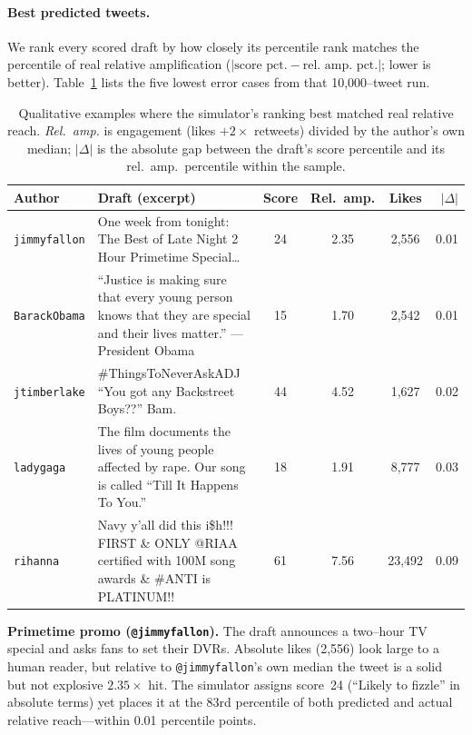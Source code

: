\documentclass[11pt]{article}
\begin{document}
\paragraph{Best predicted tweets.}
We rank every scored draft by how closely its percentile rank matches the
percentile of real relative amplification
($|\text{score pct.} - \text{rel.\ amp.\ pct.}|$; lower is better). Table~\ref{tab:qual-examples} lists the five lowest
error cases from that 10{,}000--tweet run.

\begin{table}[t]
\centering
\small
\caption{Qualitative examples where the simulator's ranking best matched real
relative reach. \emph{Rel.\ amp.} is engagement (likes $+ 2\times$ retweets)
divided by the author's own median; \emph{$|\Delta|$} is the absolute gap between
the draft's score percentile and its rel.\ amp.\ percentile within the sample.}
\label{tab:qual-examples}
\begin{tabular}{@{}p{}p{}cccr@{}}
\toprule
Author & Draft (excerpt) & Score & Rel.\ amp. & Likes & $|\Delta|$ \\
\midrule
\texttt{jimmyfallon} &
One week from tonight: The Best of Late Night 2 Hour Primetime Special\ldots &
24 & 2.35 & 2{,}556 & 0.01 \\
\texttt{BarackObama} &
``Justice is making sure that every young person knows that they are special
and their lives matter.'' ---President Obama &
15 & 1.70 & 2{,}542 & 0.01 \\
\texttt{jtimberlake} &
\#ThingsToNeverAskADJ ``You got any Backstreet Boys??'' Bam. &
44 & 4.52 & 1{,}627 & 0.02 \\
\texttt{ladygaga} &
The film documents the lives of young people affected by rape. Our song is
called ``Till It Happens To You.'' &
18 & 1.91 & 8{,}777 & 0.03 \\
\texttt{rihanna} &
Navy y'all did this i\$h!!! FIRST \& ONLY @RIAA certified with 100M song awards
\& \#ANTI is PLATINUM!! &
61 & 7.56 & 23{,}492 & 0.09 \\
\bottomrule
\end{tabular}
\end{table}

\noindent
\textbf{Primetime promo (\texttt{@jimmyfallon}).}
The draft announces a two--hour TV special and asks fans to set their DVRs.
Absolute likes (2{,}556) look large to a human reader, but relative to
\texttt{@jimmyfallon}'s own median the tweet is a solid but not explosive
$2.35\times$ hit. The simulator assigns score~24 (``Likely to fizzle'' in
absolute terms) yet places it at the 83rd percentile of both predicted and
actual relative reach---within 0.01 percentile points.
\end{document}
